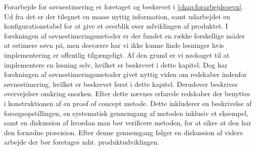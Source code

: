 Forarbejde for søvnestimering er foretaget og beskrevet i \cref{chap:forarbejdsoevn}.
Ud fra det er der tilegnet en masse nyttig information, samt udarbejdet en konfigurationstabel for at give et overblik over udviklingen af produktet.
I forskningen af søvnestimeringsmetoder er der fundet en række forskellige måder at estimere søvn på, men desværre har vi ikke kunne finde løsninger hvis implementering er offentlig tilgængeligt.
Af den grund er vi nødsaget til at implementere en løsning selv, hvilket er beskrevet i dette kapitel.
Dog har forskningen af søvnestimeringsmetoder givet nyttig viden om redskaber indenfor søvnestimering, hvilket er beskrevet først i dette kapitel.
Derudover beskrives overvejelser omkring snorken.
Efter dette nævnes erfarede redskaber der benyttes i konstruktionen af en proof of concept metode.
Dette inkluderer en beskrivelse af forsøgsopstillingen, en systematisk gennemgang af metoden inklusiv et eksempel, samt en diskussion af hvordan man bør verificere metoden, for at sikre at den har den fornødne præcision.
Efter denne gennemgang følger en diskussion af videre arbejde der bør foretages mht. produktudviklingen.







